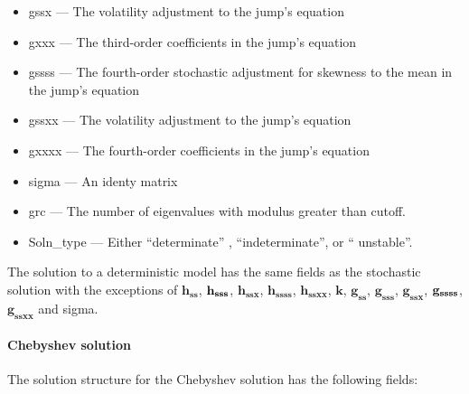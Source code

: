 \documentclass[notitlepage,11pt]{article}
\begin{document}
\begin{itemize}
\item gssx --- The volatility adjustment to the jump's equation

\item gxxx --- The third-order coefficients in the jump's equation

\item gssss --- The fourth-order stochastic adjustment for skewness to the
mean in the jump's equation

\item gssxx --- The volatility adjustment to the jump's equation

\item gxxxx --- The fourth-order coefficients in the jump's equation

\item sigma --- An identy matrix

\item grc --- The number of eigenvalues with modulus greater than cutoff.

\item Soln\_type --- Either \textquotedblleft determinate\textquotedblright
, \textquotedblleft indeterminate\textquotedblright , or \textquotedblleft
unstable\textquotedblright .
\end{itemize}

The solution to a deterministic model has the same fields as the stochastic
solution with the exceptions of $\mathbf{h}_{\mathbf{ss}}$, $\mathbf{h}_{%
\mathbf{sss}}$, $\mathbf{h}_{\mathbf{ssx}}$, $\mathbf{h}_{\mathbf{ssss}}$, $%
\mathbf{h}_{\mathbf{ssxx}}$, $\mathbf{k}$, $\mathbf{g}_{\mathbf{ss}}$, $%
\mathbf{g}_{\mathbf{sss}}$, $\mathbf{g}_{\mathbf{ssx}}$, $\mathbf{g}_{%
\mathbf{ssss}}$, $\mathbf{g}_{\mathbf{ssxx}}$ and sigma.

\paragraph{Chebyshev solution}

The solution structure for the Chebyshev solution has the following fields:
\end{document}
